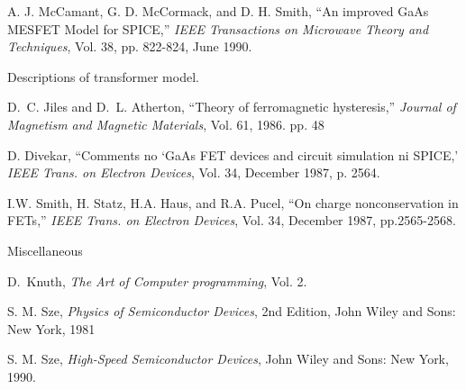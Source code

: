 \begin{thebibliography}{999}
A. J. McCamant, G. D. McCormack, and D. H. Smith, ``An improved GaAs MESFET
Model for SPICE,'' {\it IEEE Transactions on Microwave Theory and Techniques},
Vol. 38, pp. 822-824, June 1990.

Descriptions of transformer model.

D.~C. Jiles and D.~L. Atherton, ``Theory of ferromagnetic hysteresis,''
{\it Journal of Magnetism and Magnetic Materials}, Vol. 61, 1986. pp. 48

D. Divekar, ``Comments no `GaAs FET devices and circuit simulation ni
SPICE,' {\it IEEE Trans. on Electron Devices}, Vol. 34, December 1987,
p. 2564.

I.W. Smith, H. Statz, H.A. Haus, and R.A. Pucel,
``On charge nonconservation in FETs,'' 
{\it IEEE Trans. on Electron Devices}, Vol. 34, December 1987, pp.2565-2568.

Miscellaneous


D.~Knuth, {\it The Art of Computer programming}, Vol. 2.

S. M. Sze, {\it Physics of Semiconductor Devices}, 2nd Edition, John Wiley
and Sons: New York, 1981

S. M. Sze, {\it High-Speed Semiconductor Devices}, John Wiley
and Sons: New York, 1990.

\end{thebibliography}
